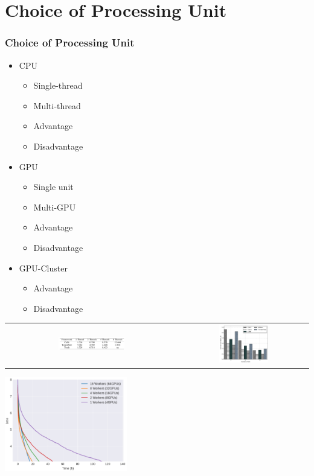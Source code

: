 \documentclass{beamer}
\begin{document}
\section{Choice of Processing Unit}
\begin{frame}
\frametitle{Choice of Processing Unit}
\begin{itemize}
\item CPU
\begin{itemize}
\item Single-thread
\item Multi-thread
\item Advantage
\item Disadvantage
\end{itemize}
\item GPU
\begin{itemize}
\item Single unit
\item Multi-GPU
\item Advantage
\item Disadvantage
\end{itemize}
\item GPU-Cluster
\begin{itemize}
\item Advantage
\item Disadvantage
\end{itemize}
\end{itemize}
\end{frame}

\begin{frame}
\begin{tabular}{c c}
\includegraphics[width=0.4\textwidth]{table.png} &\includegraphics[width=0.4\textwidth]{a.png} \\
\end{tabular}
\centering
\includegraphics[width=0.4\textwidth]{gpu_cluster_perf_win.png}
\end{frame}
\end{document}
